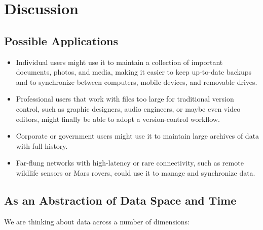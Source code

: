 \chapter{Discussion}



\section{Possible Applications}

\begin{itemize}

  \item Individual users might use it to maintain a collection of important
    documents, photos, and media, making it easier to keep up-to-date backups
    and to synchronize between computers, mobile devices, and removable drives.

  \item Professional users that work with files too large for traditional
    version control, such as graphic designers, audio engineers, or maybe even
    video editors, might finally be able to adopt a version-control workflow.

  \item Corporate or government users might use it to maintain large archives of
    data with full history.

  \item Far-flung networks with high-latency or rare connectivity, such as
    remote wildlife sensors or Mars rovers, could use it to manage and
    synchronize data.

\end{itemize}



\section{As an Abstraction of Data Space and Time}

We are thinking about data across a number of dimensions:

